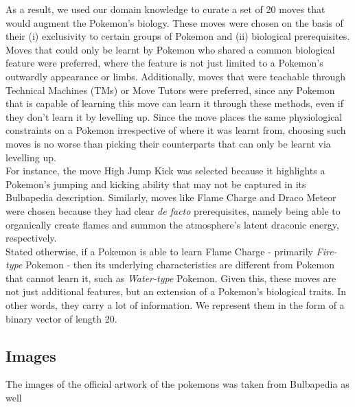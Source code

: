 \documentclass{winnower}
\begin{document}
As a result, we used our domain knowledge to curate a set of 20 moves that would augment the Pokemon's biology. These moves were chosen on the basis of their (i) exclusivity to certain groups of Pokemon and (ii) biological prerequisites. Moves that could only be learnt by Pokemon who shared a common biological feature were preferred, where the feature is not just limited to a Pokemon's outwardly appearance or limbs. Additionally, moves that were teachable through Technical Machines (TMs) or Move Tutors were preferred, since any Pokemon that is capable of learning this move can learn it through these methods, even if they don't learn it by levelling up. Since the move places the same physiological constraints on a Pokemon irrespective of where it was learnt from, choosing such moves is no worse than picking their counterparts that can only be learnt via levelling up.\\

For instance, the move High Jump Kick was selected because it highlights a Pokemon's jumping and kicking ability that may not be captured in its Bulbapedia description. Similarly, moves like Flame Charge and Draco Meteor were chosen because they had clear \textit{de facto} prerequisites, namely being able to organically create flames and summon the atmosphere's latent draconic energy, respectively. \\

Stated otherwise, if a Pokemon is able to learn Flame Charge - primarily \textit{Fire-type} Pokemon - then its underlying characteristics are different from Pokemon that cannot learn it, such as \textit{Water-type} Pokemon. Given this, these moves are not just additional features, but an extension of a Pokemon's biological traits. In other words, they carry a lot of information. We represent them in the form of a binary vector of length 20.


\subsection{Images}

The images of the official artwork of the pokemons was taken from Bulbapedia as well



\end{document}
